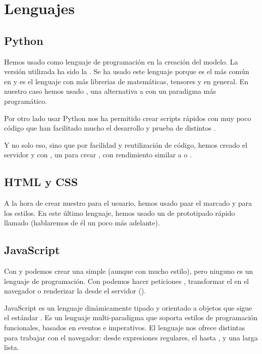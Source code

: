 
\section{Lenguajes}

\subsection{Python}

Hemos usado  como lenguaje de programación en la creación del modelo. La versión utilizada ha sido la . Se ha usado este lenguaje porque es el más común en  y es el lenguaje con más librerias de matemáticas, tensores y  en general. En nuestro caso hemos usado , una alternativa a  con un paradigma más programático.

Por otro lado usar Python nos ha permitido crear scripts rápidos con muy poco código que han facilitado mucho el desarrollo y prueba de distintos .

Y no solo eso, sino que por facilidad y reutilización de código, hemos creado el servidor y  con , un  para crear , con rendimiento similar a  o .

\subsection{HTML y CSS}

A la hora de crear nuestro  para el usuario, hemos usado  paar el marcado y  para los estilos. En este último lenguaje, hemos usado un  de prototipado rápido llamado  (hablaremos de él un poco más adelante).

\subsection{JavaScript}

Con  y  podemos crear una  simple (aunque con mucho estilo), pero ninguno es un lenguaje de programación. Con  podemos hacer peticiones , transformar el  en el navegador o renderizar la  desde el servidor ().

JavaScript es un lenguaje dinámicamente tipado y orientado a objetos que sigue el estándar . Es un lenguaje multi-paradigma que soporta estilos de programación funcionales, basados en eventos e imperativos. El lenguaje nos ofrece distintas  para trabajar con el navegador: desde expresiones regulares, el  hasta , y una larga lista.

